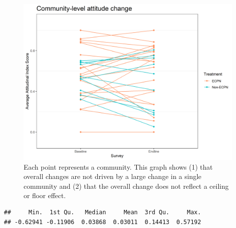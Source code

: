 \documentclass[
]{article}
\newenvironment{Shaded}{\begin{snugshade}}{\end{snugshade}}
\newcommand{\DecValTok}[1]{\textcolor[rgb]{0.00,0.00,0.81}{#1}}
\newcommand{\DocumentationTok}[1]{\textcolor[rgb]{0.56,0.35,0.01}{\textbf{\textit{#1}}}}
\newcommand{\FunctionTok}[1]{\textcolor[rgb]{0.00,0.00,0.00}{#1}}
\newcommand{\NormalTok}[1]{#1}
\newcommand{\SpecialCharTok}[1]{\textcolor[rgb]{0.00,0.00,0.00}{#1}}
\begin{document}
\begin{figure}%
\centering
\includegraphics[width=\linewidth]{../survey_dat/figs/did_plots/attitudeComm.plot_disag.png}
\caption{Each point represents a community. This graph shows (1) that overall changes are not driven by a large change in a single community and (2) that the overall change does not reflect a ceiling or floor effect.}\label{fig:att_comm_dis}
\end{figure}

\begin{Shaded}
\end{Shaded}

\begin{verbatim}
##     Min.  1st Qu.   Median     Mean  3rd Qu.     Max. 
## -0.62941 -0.11906  0.03868  0.03011  0.14413  0.57192
\end{verbatim}

\begin{Shaded}
\end{Shaded}
\end{document}
